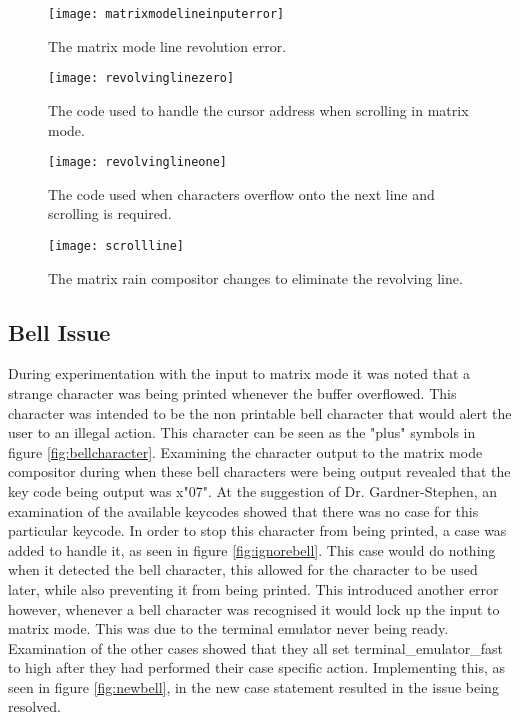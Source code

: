 \begin{figure}
  \centering
  \texttt{[image: matrixmodelineinputerror]}
  \caption{The matrix mode line revolution error.}
  \label{fig:matrixmodelineinputerror}
\end{figure}

\begin{figure}
  \centering
  \texttt{[image: revolvinglinezero]}
  \caption{The code used to handle the cursor address when scrolling in matrix mode.}
  \label{fig:revolvinglinezero}
\end{figure}

\begin{figure}
  \centering
  \texttt{[image: revolvinglineone]}
  \caption{The code used when characters overflow onto the next line and scrolling is required.}
  \label{fig:revolvinglineone}
\end{figure}

\begin{figure}
  \centering
  \texttt{[image: scrollline]}
  \caption{The matrix rain compositor changes to eliminate the revolving line.}
  \label{fig:scrollline}
\end{figure}


\subsection{Bell Issue}

\label{Ch5 Sec3 Sub2}

During experimentation with the input to matrix mode it was noted that a strange character was being printed whenever the buffer overflowed. This character was intended to be the non printable bell character that would alert the user to an illegal action. This character can be seen as the "plus" symbols in figure \ref{fig:bellcharacter}. Examining the character output to the matrix mode compositor during when these bell characters were being output revealed that the key code being output was x"07". At the suggestion of Dr. Gardner-Stephen, an examination of the available keycodes showed that there was no case for this particular keycode. In order to stop this character from being printed, a case was added to handle it, as seen in figure \ref{fig:ignorebell}. This case would do nothing when it detected the bell character, this allowed for the character to be used later, while also preventing it from being printed. This introduced another error however, whenever a bell character was recognised it would lock up the input to matrix mode. This was due to the terminal emulator never being ready. Examination of the other cases showed that they all set terminal\_emulator\_fast to high after they had performed their case specific action. Implementing this, as seen in figure \ref{fig:newbell}, in the new case statement resulted in the issue being resolved.

